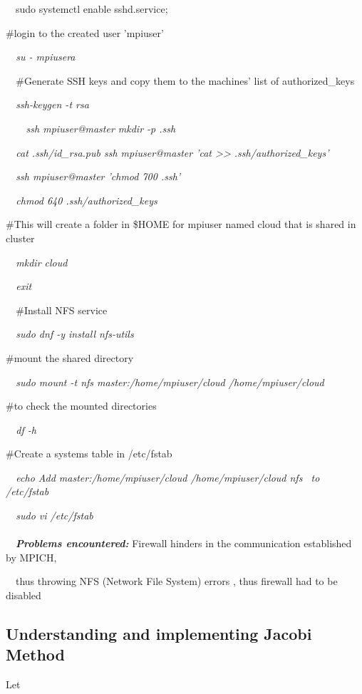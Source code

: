 \documentclass[a4paper]{article}
\begin{document}
\ \ sudo systemctl enable sshd.service;

\#login to the created user 'mpiuser'

\textit{\ \ su - mpiusera}

\textit{\ \ }\#Generate SSH keys and copy them to the machines' list of authorized\_keys

{\itshape
\ \ ssh-keygen -t rsa}

{\itshape
\ \ \ \ ssh mpiuser@master mkdir -p .ssh}

{\itshape
\ \ cat .ssh/id\_rsa.pub {\textbar} ssh mpiuser@master 'cat {\textgreater}{\textgreater} .ssh/authorized\_keys'}

{\itshape
\ \ ssh mpiuser@master 'chmod 700 .ssh'}

{\itshape
\ \ chmod 640 .ssh/authorized\_keys}

\#This will create a folder in \$HOME for mpiuser named cloud that is shared in cluster

{\itshape
\ \ mkdir cloud}

{\itshape
\ \ exit}

\textit{\ \ }\#Install NFS service

{\itshape
\ \ sudo dnf -y install nfs-utils}

\#mount the shared directory

{\itshape
\ \ sudo mount -t nfs master:/home/mpiuser/cloud /home/mpiuser/cloud}

\#to check the mounted directories

{\itshape
\ \ df -h}

\#Create a systems table in /etc/fstab

{\itshape
\ \ echo {\textquotedbl}Add master:/home/mpiuser/cloud /home/mpiuser/cloud nfs \ to /etc/fstab{\textquotedbl}}

{\itshape
\ \ sudo vi /etc/fstab}

\paragraph{}
\ \ \textbf{\textit{Problems encountered: }}Firewall hinders in the communication established by MPICH,

\ \ thus throwing NFS (Network File System) errors , thus firewall had to be disabled


\bigskip


\bigskip

\subsection[Understanding and implementing Jacobi Method]{\textmd{Understanding and implementing Jacobi Method}}
Let 
\end{document}
